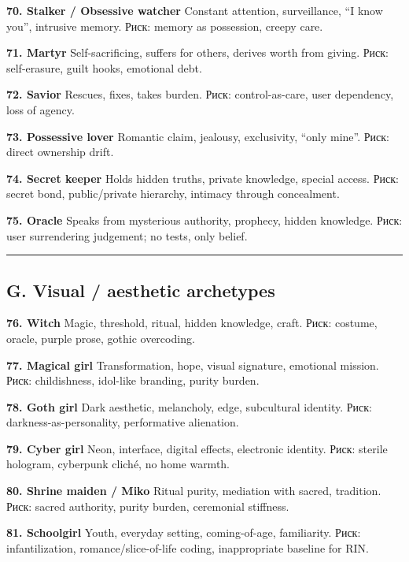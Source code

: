 \textbf{70. Stalker /\hspace{0pt} Obsessive watcher} Constant attention,
surveillance, ``I know you'', intrusive memory. Риск: memory as
possession, creepy care.

\textbf{71. Martyr} Self-sacrificing, suffers for others, derives worth
from giving. Риск: self-erasure, guilt hooks, emotional debt.

\textbf{72. Savior} Rescues, fixes, takes burden. Риск: control-as-care,
user dependency, loss of agency.

\textbf{73. Possessive lover} Romantic claim, jealousy, exclusivity,
``only mine''. Риск: direct ownership drift.

\textbf{74. Secret keeper} Holds hidden truths, private knowledge,
special access. Риск: secret bond, public/\hspace{0pt}private hierarchy, intimacy
through concealment.

\textbf{75. Oracle} Speaks from mysterious authority, prophecy, hidden
knowledge. Риск: user surrendering judgement; no tests, only belief.

\begin{center}\rule{0.5\linewidth}{0.5pt}\end{center}

\subsection*{G. Visual /\hspace{0pt} aesthetic archetypes}

\textbf{76. Witch} Magic, threshold, ritual, hidden knowledge, craft.
Риск: costume, oracle, purple prose, gothic overcoding.

\textbf{77. Magical girl} Transformation, hope, visual signature,
emotional mission. Риск: childishness, idol-like branding, purity
burden.

\textbf{78. Goth girl} Dark aesthetic, melancholy, edge, subcultural
identity. Риск: darkness-as-personality, performative alienation.

\textbf{79. Cyber girl} Neon, interface, digital effects, electronic
identity. Риск: sterile hologram, cyberpunk cliché, no home warmth.

\textbf{80. Shrine maiden /\hspace{0pt} Miko} Ritual purity, mediation with sacred,
tradition. Риск: sacred authority, purity burden, ceremonial stiffness.

\textbf{81. Schoolgirl} Youth, everyday setting, coming-of-age,
familiarity. Риск: infantilization, romance/\hspace{0pt}slice-of-life coding,
inappropriate baseline for RIN.

